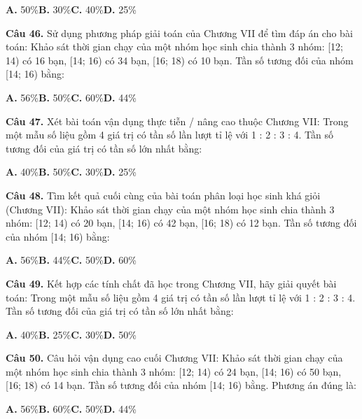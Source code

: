 \documentclass[11pt,a4paper]{article}
\begin{document}
\hspace*{1.5em}\textbf{A.} 50\%\quad\quad \textbf{B.} 30\%\quad\quad \textbf{C.} 40\%\quad\quad \textbf{D.} 25\%\par\vspace{2pt}
\textbf{\color{primary} Câu 46.} Sử dụng phương pháp giải toán của Chương VII để tìm đáp án cho bài toán: Khảo sát thời gian chạy của một nhóm học sinh chia thành 3 nhóm: [12; 14) có 16 bạn, [14; 16) có 34 bạn, [16; 18) có 10 bạn. Tần số tương đối của nhóm [14; 16) bằng:\par
\hspace*{1.5em}\textbf{A.} 56\%\quad\quad \textbf{B.} 50\%\quad\quad \textbf{C.} 60\%\quad\quad \textbf{D.} 44\%\par\vspace{2pt}
\textbf{\color{primary} Câu 47.} Xét bài toán vận dụng thực tiễn / nâng cao thuộc Chương VII: Trong một mẫu số liệu gồm 4 giá trị có tần số lần lượt tỉ lệ với 1 : 2 : 3 : 4. Tần số tương đối của giá trị có tần số lớn nhất bằng:\par
\hspace*{1.5em}\textbf{A.} 40\%\quad\quad \textbf{B.} 50\%\quad\quad \textbf{C.} 30\%\quad\quad \textbf{D.} 25\%\par\vspace{2pt}
\textbf{\color{primary} Câu 48.} Tìm kết quả cuối cùng của bài toán phân loại học sinh khá giỏi (Chương VII): Khảo sát thời gian chạy của một nhóm học sinh chia thành 3 nhóm: [12; 14) có 20 bạn, [14; 16) có 42 bạn, [16; 18) có 12 bạn. Tần số tương đối của nhóm [14; 16) bằng:\par
\hspace*{1.5em}\textbf{A.} 56\%\quad\quad \textbf{B.} 44\%\quad\quad \textbf{C.} 50\%\quad\quad \textbf{D.} 60\%\par\vspace{2pt}
\textbf{\color{primary} Câu 49.} Kết hợp các tính chất đã học trong Chương VII, hãy giải quyết bài toán: Trong một mẫu số liệu gồm 4 giá trị có tần số lần lượt tỉ lệ với 1 : 2 : 3 : 4. Tần số tương đối của giá trị có tần số lớn nhất bằng:\par
\hspace*{1.5em}\textbf{A.} 40\%\quad\quad \textbf{B.} 25\%\quad\quad \textbf{C.} 30\%\quad\quad \textbf{D.} 50\%\par\vspace{2pt}
\textbf{\color{primary} Câu 50.} Câu hỏi vận dụng cao cuối Chương VII: Khảo sát thời gian chạy của một nhóm học sinh chia thành 3 nhóm: [12; 14) có 24 bạn, [14; 16) có 50 bạn, [16; 18) có 14 bạn. Tần số tương đối của nhóm [14; 16) bằng. Phương án đúng là:\par
\hspace*{1.5em}\textbf{A.} 56\%\quad\quad \textbf{B.} 60\%\quad\quad \textbf{C.} 50\%\quad\quad \textbf{D.} 44\%\par\vspace{2pt}
\end{document}
